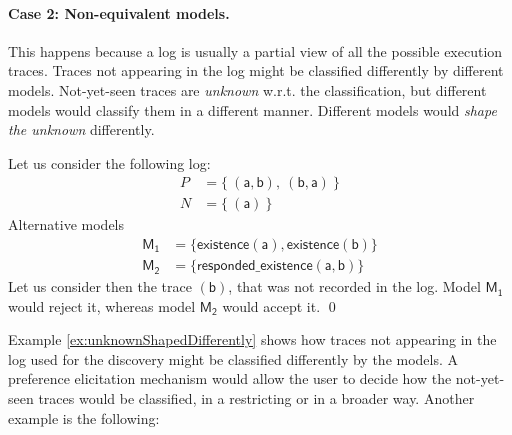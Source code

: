 \paragraph{Case 2: Non-equivalent models.}
 This happens because a log is usually a partial view of all the possible execution traces. Traces not appearing in the log might be classified differently by different models. Not-yet-seen traces are \emph{unknown} w.r.t. the classification, but different models would classify them in a different manner. Different models would \emph{shape the unknown} differently.

\begin{example}
\label{ex:unknownShapedDifferently}
Let us consider the following log:
\begin{align*}
P & = \{\ (\mathsf{a}, \mathsf{b}),\ (\mathsf{b}, \mathsf{a})\ \} \\
N & = \{\ (\mathsf{a})\ \}
\end{align*}
%
Alternative models 
\begin{align*}
\mathsf{M_1} & = \{ \mathsf{existence(a),existence(b)}\} \\
\mathsf{M_2} & = \{ \mathsf{responded\_existence(a, b)}\}
\end{align*}
%
Let us consider then the trace $\mathsf{(b)}$, that was not recorded in the log. Model $\mathsf{M_1}$ would reject it, whereas model $\mathsf{M_2}$ would accept it.
\qed
\end{example}

Example \ref{ex:unknownShapedDifferently} shows how traces not appearing in the log used for the discovery might be %
 classified differently by the models. A preference elicitation mechanism would allow the user to decide how the not-yet-seen traces would be classified, in a restricting or in a broader way. Another example is the following:

